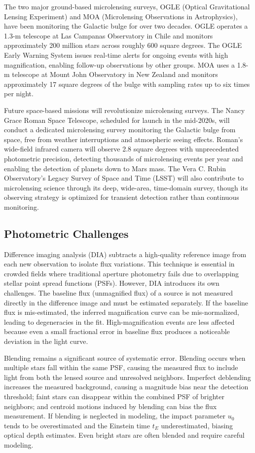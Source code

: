 The two major ground-based microlensing surveys, OGLE (Optical Gravitational Lensing Experiment) and MOA (Microlensing Observations in Astrophysics), have been monitoring the Galactic bulge for over two decades. OGLE operates a 1.3-m telescope at Las Campanas Observatory in Chile and monitors approximately 200 million stars across roughly 600 square degrees. The OGLE Early Warning System issues real-time alerts for ongoing events with high magnification, enabling follow-up observations by other groups. MOA uses a 1.8-m telescope at Mount John Observatory in New Zealand and monitors approximately 17 square degrees of the bulge with sampling rates up to six times per night.

Future space-based missions will revolutionize microlensing surveys. The Nancy Grace Roman Space Telescope, scheduled for launch in the mid-2020s, will conduct a dedicated microlensing survey monitoring the Galactic bulge from space, free from weather interruptions and atmospheric seeing effects. Roman's wide-field infrared camera will observe 2.8 square degrees with unprecedented photometric precision, detecting thousands of microlensing events per year and enabling the detection of planets down to Mars mass. The Vera C. Rubin Observatory's Legacy Survey of Space and Time (LSST) will also contribute to microlensing science through its deep, wide-area, time-domain survey, though its observing strategy is optimized for transient detection rather than continuous monitoring.

\subsection{Photometric Challenges}
\label{sec:photometric_challenges}

Difference imaging analysis (DIA) subtracts a high-quality reference image from each new observation to isolate flux variations. This technique is essential in crowded fields where traditional aperture photometry fails due to overlapping stellar point spread functions (PSFs). However, DIA introduces its own challenges. The baseline flux (unmagnified flux) of a source is not measured directly in the difference image and must be estimated separately. If the baseline flux is mis-estimated, the inferred magnification curve can be mis-normalized, leading to degeneracies in the fit. High-magnification events are less affected because even a small fractional error in baseline flux produces a noticeable deviation in the light curve.

Blending remains a significant source of systematic error. Blending occurs when multiple stars fall within the same PSF, causing the measured flux to include light from both the lensed source and unresolved neighbors. Imperfect deblending increases the measured background, causing a magnitude bias near the detection threshold; faint stars can disappear within the combined PSF of brighter neighbors; and centroid motions induced by blending can bias the flux measurement. If blending is neglected in modeling, the impact parameter $u_0$ tends to be overestimated and the Einstein time $t_E$ underestimated, biasing optical depth estimates. Even bright stars are often blended and require careful modeling.

